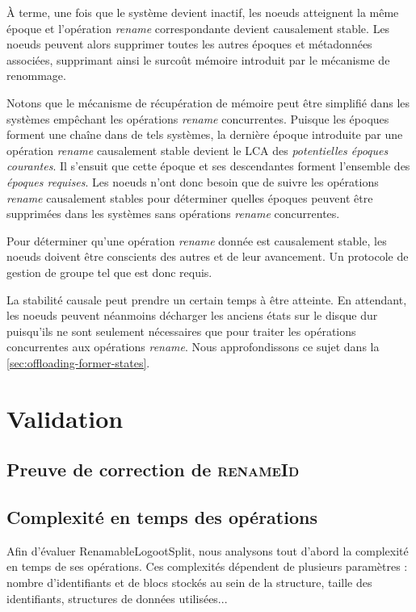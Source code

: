 \documentclass[12pt]{thesul}
\begin{document}
À terme, une fois que le système devient inactif, les noeuds atteignent la même époque et l'opération \emph{rename} correspondante devient causalement stable.
Les noeuds peuvent alors supprimer toutes les autres époques et métadonnées associées, supprimant ainsi le surcoût mémoire introduit par le mécanisme de renommage.

Notons que le mécanisme de récupération de mémoire peut être simplifié dans les systèmes empêchant les opérations \emph{rename} concurrentes.
Puisque les époques forment une chaîne dans de tels systèmes, la dernière époque introduite par une opération \emph{rename} causalement stable devient le \ac{LCA} des \emph{potentielles époques courantes}.
Il s'ensuit que cette époque et ses descendantes forment l'ensemble des \emph{époques requises}.
Les noeuds n'ont donc besoin que de suivre les opérations \emph{rename} causalement stables pour déterminer quelles époques peuvent être supprimées dans les systèmes sans opérations \emph{rename} concurrentes.

Pour déterminer qu'une opération \emph{rename} donnée est causalement stable, les noeuds doivent être conscients des autres et de leur avancement.
Un protocole de gestion de groupe tel que \cite{swim2002,lifeguard2018} est donc requis.

La stabilité causale peut prendre un certain temps à être atteinte.
En attendant, les noeuds peuvent néanmoins décharger les anciens états sur le disque dur puisqu'ils ne sont seulement nécessaires que pour traiter les opérations concurrentes aux opérations \emph{rename}.
Nous approfondissons ce sujet dans la \autoref{sec:offloading-former-states}.

\section{Validation}

\subsection{Preuve de correction de \textsc{renameId}}

\subsection{Complexité en temps des opérations}

Afin d'évaluer RenamableLogootSplit, nous analysons tout d'abord la complexité en temps de ses opérations.
Ces complexités dépendent de plusieurs paramètres : nombre d'identifiants et de blocs stockés au sein de la structure, taille des identifiants, structures de données utilisées...
\end{document}
